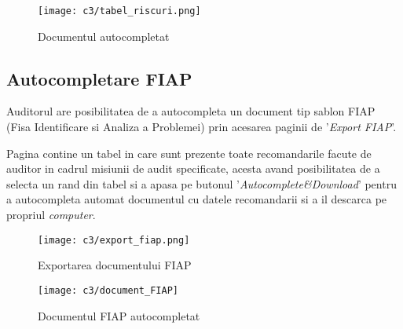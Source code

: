 \vspace{1cm}
\begin{figure}[h]
	\centering
	
	\texttt{[image: c3/tabel\_riscuri.png]}
	\caption{Documentul autocompletat}
\end{figure}


\subsection*{Autocompletare FIAP}
Auditorul are posibilitatea de a autocompleta un document tip sablon FIAP (Fisa Identificare si Analiza a Problemei) prin acesarea paginii de '\textit{Export FIAP}'.

Pagina contine un tabel in care sunt prezente toate recomandarile facute de auditor in cadrul misiunii de audit specificate, acesta avand posibilitatea de a selecta un rand din tabel si a apasa pe butonul '\textit{Autocomplete\&Download}' pentru a autocompleta automat documentul cu datele recomandarii si a il descarca pe propriul \textit{computer}.


\vspace{1cm}
\begin{figure}[h]
	\centering
	
	\texttt{[image: c3/export\_fiap.png]}
	\caption{Exportarea documentului FIAP}
\end{figure}

\vspace{1cm}
\begin{figure}[h]
	\centering
	
	\texttt{[image: c3/document\_FIAP]}
	\caption{Documentul FIAP autocompletat}
\end{figure}

 


